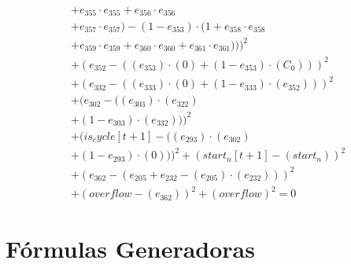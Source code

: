 \documentclass[10pt, a4paper]{article}
\begin{document}
\begin{align*}
& + e_{355} \cdot e_{355} + e_{356} \cdot e_{356} \\
& + e_{357} \cdot e_{357}) - (1 - e_{353}) \cdot (1 + e_{358} \cdot e_{358} \\
& + e_{359} \cdot e_{359} + e_{360} \cdot e_{360} + e_{361} \cdot e_{361})))^{2} \\
& + (e_{352} - ((e_{353})  \cdot  (0) + (1 - e_{353})  \cdot  (C_{0})))^{2} \\
& + (e_{332} - ((e_{333})  \cdot  (0) + (1 - e_{333})  \cdot  (e_{352})))^{2} \\
& + (e_{302} - ((e_{303})  \cdot  (e_{322}) \\
& + (1 - e_{303})  \cdot  (e_{332})))^{2} \\
& + (is_cycle[t+1] - ((e_{293})  \cdot  (e_{302}) \\
& + (1 - e_{293})  \cdot  (0)))^{2} + (start_n[t+1] - (start_n))^{2} \\
& + (e_{362} - (e_{205} + e_{232} - (e_{205}) \cdot (e_{232})))^{2} \\
& + (overflow - (e_{362}))^{2} + (overflow)^{2} = 0
\end{align*}\part{Fórmulas Generadoras}
\end{document}
